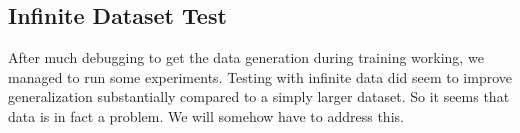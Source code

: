\documentclass[a4paper]{article}
\begin{document}
\subsection*{Infinite Dataset Test}
After much debugging to get the data generation during training working, we managed to run some experiments. Testing with infinite data did seem to improve generalization substantially compared to a simply larger dataset. So it seems that data is in fact a problem. We will somehow have to address this. 
\begin{figure}[H]
    \begin{minipage}{.45\linewidth}
        \centering
    \end{minipage}
    \begin{minipage}{.45\linewidth}
        \centering
\end{minipage}
\end{figure}
\end{document}
